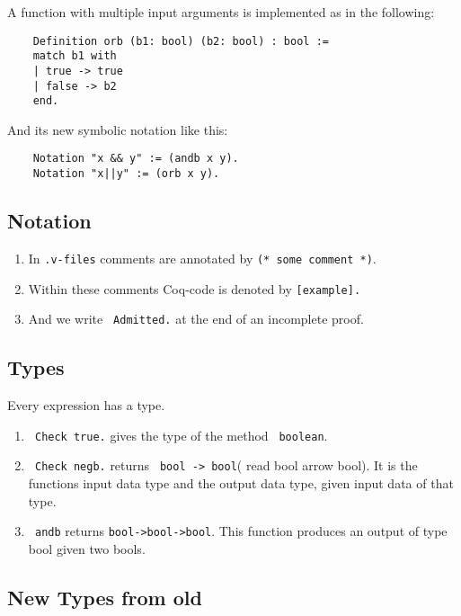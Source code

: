     A function with multiple input arguments is implemented as in the following:
    \begin{lstlisting}
    Definition orb (b1: bool) (b2: bool) : bool :=
    match b1 with
    | true -> true
    | false -> b2
    end.
    \end{lstlisting}
     
    And its new symbolic notation like this:
    \begin{lstlisting}
    Notation "x && y" := (andb x y).
    Notation "x||y" := (orb x y).
    \end{lstlisting}
    
     
\subsection{Notation}
     
    \begin{enumerate}
     \item In \texttt{.v-files} comments are annotated by \lstinline!(* some comment *)!. 
     \item Within these comments Coq-code is denoted by \lstinline![example].! 
     \item And we write \lstinline! Admitted.! at the end of an incomplete proof.    
     \end{enumerate}
     
     
\subsection{Types}

     Every expression has a type.
     \begin{enumerate}
     \item  \lstinline! Check true.! gives the type of the method \lstinline! boolean!.
     \item \lstinline! Check negb.! returns \lstinline! bool -> bool!( read \glqq bool arrow bool\grqq).
      It is the functions input data type and the output data type, given input data of that type.
      \item \lstinline! andb! returns \lstinline!bool->bool->bool!. This function produces an output of type bool given two bools.
     \end{enumerate}
     
\subsection{New Types from old}

